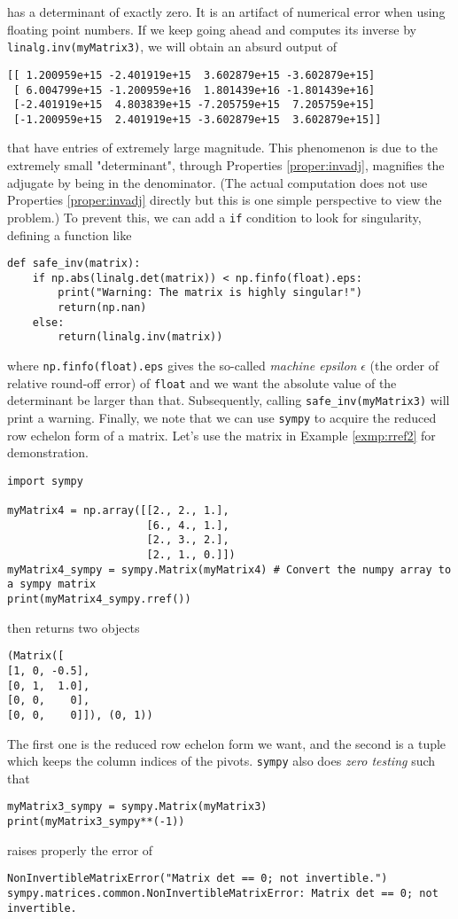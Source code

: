 has a determinant of exactly zero. It is an artifact of numerical error when using floating point numbers. If we keep going ahead and computes its inverse by \verb|linalg.inv(myMatrix3)|, we will obtain an absurd output of
\begin{lstlisting}
[[ 1.200959e+15 -2.401919e+15  3.602879e+15 -3.602879e+15]
 [ 6.004799e+15 -1.200959e+16  1.801439e+16 -1.801439e+16]
 [-2.401919e+15  4.803839e+15 -7.205759e+15  7.205759e+15]
 [-1.200959e+15  2.401919e+15 -3.602879e+15  3.602879e+15]]
\end{lstlisting}
that have entries of extremely large magnitude. This phenomenon is due to the extremely small "determinant", through Properties \ref{proper:invadj}, magnifies the adjugate by being in the denominator. (The actual computation does not use Properties \ref{proper:invadj} directly but this is one simple perspective to view the problem.) To prevent this, we can add a \verb|if| condition to look for singularity, defining a function like
\begin{lstlisting}
def safe_inv(matrix):
    if np.abs(linalg.det(matrix)) < np.finfo(float).eps:
        print("Warning: The matrix is highly singular!")
        return(np.nan)
    else:
        return(linalg.inv(matrix))
\end{lstlisting}
where \verb|np.finfo(float).eps| gives the so-called \textit{machine epsilon} $\epsilon$ (the order of relative round-off error) of \verb|float| and we want the absolute value of the determinant be larger than that. Subsequently, calling \verb|safe_inv(myMatrix3)| will print a warning. Finally, we note that we can use \verb|sympy| to acquire the reduced row echelon form of a matrix. Let's use the matrix in Example \ref{exmp:rref2} for demonstration.
\begin{lstlisting}
import sympy

myMatrix4 = np.array([[2., 2., 1.],
                      [6., 4., 1.],
                      [2., 3., 2.],
                      [2., 1., 0.]])
myMatrix4_sympy = sympy.Matrix(myMatrix4) # Convert the numpy array to a sympy matrix
print(myMatrix4_sympy.rref())
\end{lstlisting}
then returns two objects
\begin{lstlisting}
(Matrix([
[1, 0, -0.5],
[0, 1,  1.0],
[0, 0,    0],
[0, 0,    0]]), (0, 1))    
\end{lstlisting}
The first one is the reduced row echelon form we want, and the second is a tuple which keeps the column indices of the pivots. \verb|sympy| also does \textit{zero testing} such that
\begin{lstlisting}
myMatrix3_sympy = sympy.Matrix(myMatrix3)
print(myMatrix3_sympy**(-1))    
\end{lstlisting}
raises properly the error of
\begin{lstlisting}
NonInvertibleMatrixError("Matrix det == 0; not invertible.") sympy.matrices.common.NonInvertibleMatrixError: Matrix det == 0; not invertible. 
\end{lstlisting}

